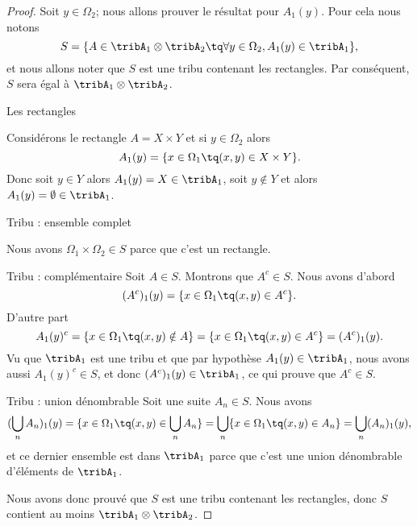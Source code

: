 \begin{proof}
    Soit \( y\in\Omega_2\); nous allons prouver le résultat pour \( A_1(y)\). Pour cela nous notons 
    \begin{equation}
        S=\{ A\in \tribA_1\otimes\tribA_2\tq \forall y\in\Omega_2, A_1(y)\in\tribA_1 \},
    \end{equation}
    et nous allons noter que \( S\) est une tribu contenant les rectangles. Par conséquent, \( S\) sera égal à \( \tribA_1\otimes \tribA_2\).

    \begin{subproof}
        \item[Les rectangles]

            Considérons le rectangle \( A=X\times Y\) et si \( y\in \Omega_2\) alors
            \begin{equation}
                A_1(y)=\{ x\in \Omega_1\tq (x,y)\in X\times Y \}.  
            \end{equation}
            Donc soit \( y\in Y\) alors \( A_1(y)=X\in\tribA_1\), soit \( y\notin Y\) et alors \( A_1(y)=\emptyset\in\tribA_1\).

        \item[Tribu : ensemble complet]

            Nous avons \( \Omega_1\times \Omega_2\in S\) parce que c'est un rectangle.

        \item[Tribu : complémentaire] Soit \( A\in S\). Montrons que \( A^c\in S\). Nous avons d'abord
            \begin{equation}
                (A^c)_1(y)=\{ x\in \Omega_1\tq (x,y)\in A^c \}.
            \end{equation}
            D'autre part
            \begin{equation}
                A_1(y)^c=\{ x\in\Omega_1\tq (x,y)\notin A \}=\{ x\in \Omega_1\tq (x,y)\in A^c \}=(A^c)_1(y).
            \end{equation}
            Vu que \( \tribA_1\) est une tribu et que par hypothèse \( A_1(y)\in\tribA_1\), nous avons aussi \( A_1(y)^c\in S\), et donc \( (A^c)_1(y)\in \tribA_1\), ce qui prouve que \( A^c\in S\).

        \item[Tribu : union dénombrable] Soit une suite \( A_n\in S\). Nous avons
            \begin{equation}
                (\bigcup_nA_n)_1(y)=\{ x\in\Omega_1\tq (x,y)\in \bigcup_nA_n \}=\bigcup_n\{ x\in\Omega_1\tq (x,y)\in A_n \}=\bigcup_n(A_n)_1(y),
            \end{equation}
            et ce dernier ensemble est dans \( \tribA_1\) parce que c'est une union dénombrable d'éléments de \( \tribA_1\).
        
    \end{subproof}
    Nous avons donc prouvé que \( S\) est une tribu contenant les rectangles, donc \( S\) contient au moins \( \tribA_1\otimes \tribA_2\).
\end{proof}

